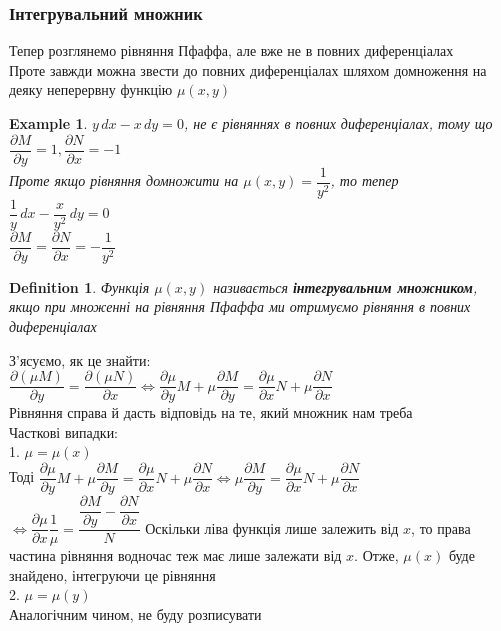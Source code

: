\documentclass[a4paper, 10pt]{article}
\theoremstyle{theoremdd}
\theoremstyle{theoremdd}
\newtheorem{definition}[theorem]{Definition}
\theoremstyle{theoremdd}
\theoremstyle{theoremdd}
\newtheorem{example}[theorem]{Example}
\theoremstyle{theoremdd}
\theoremstyle{theoremdd}
\theoremstyle{theoremdd}
\theoremstyle{theoremdd}
\begin{document}
\subsubsection{Інтегрувальний множник}
Тепер розглянемо рівняння Пфаффа, але вже не в повних диференціалах\\
Проте завжди можна звести до повних диференціалах шляхом домноження на деяку неперервну функцію $\mu(x,y)$

\begin{example}
 $y\,dx - x\,dy = 0$, не є рівняннях в повних диференціалах, тому що\\
$\dfrac{\partial M}{\partial y} = 1, \dfrac{\partial N}{\partial x} = -1$\\
Проте якщо рівняння домножити на $\mu(x,y) = \dfrac{1}{y^2}$, то тепер\\
$\dfrac{1}{y}\,dx - \dfrac{x}{y^2}\,dy = 0$\\
$\dfrac{\partial M}{\partial y} = \dfrac{\partial N}{\partial x} = -\dfrac{1}{y^2}$
\end{example}

\begin{definition}
Функція $\mu(x,y)$ називається \textbf{інтегрувальним множником}, якщо при множенні на рівняння Пфаффа ми отримуємо рівняння в повних диференціалах
\end{definition}

З'ясуємо, як це знайти:\\
$\dfrac{\partial (\mu M)}{\partial y} = \dfrac{\partial(\mu N)}{\partial x} \iff \dfrac{\partial \mu}{\partial y} M + \mu \dfrac{\partial M}{\partial y} = \dfrac{\partial \mu}{\partial x} N + \mu \dfrac{\partial N}{\partial x}$\\
Рівняння справа й дасть відповідь на те, який множник нам треба
\bigskip \\
Часткові випадки:\\
1. $\mu = \mu(x)$\\
Тоді $\dfrac{\partial \mu}{\partial y} M + \mu \dfrac{\partial M}{\partial y} = \dfrac{\partial \mu}{\partial x} N + \mu \dfrac{\partial N}{\partial x} \iff \mu \dfrac{\partial M}{\partial y} = \dfrac{\partial \mu}{\partial x} N + \mu \dfrac{\partial N}{\partial x}$\\
$\iff \dfrac{\partial \mu}{\partial x} \dfrac{1}{\mu} = \dfrac{\dfrac{\partial M}{\partial y} - \dfrac{\partial N}{\partial x}}{N}$
Оскільки ліва функція лише залежить від $x$, то права частина рівняння водночас теж має лише залежати від $x$. Отже, $\mu(x)$ буде знайдено, інтегруючи це рівняння
\bigskip \\
2. $\mu = \mu(y)$\\
Аналогічним чином, не буду розписувати
\end{document}
